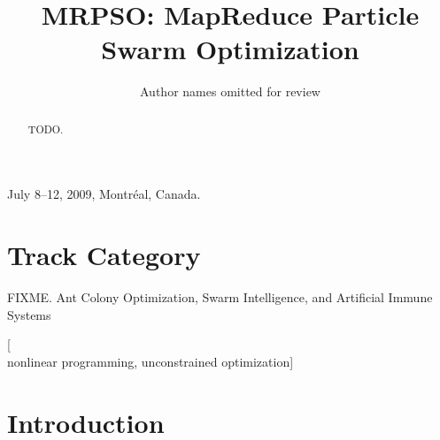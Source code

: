 \documentclass[letterpaper]{sig-alternate}
\begin{document}
\hyphenation{}

 {July 8--12, 2009, Montr\'eal, Canada.}

\title{MRPSO: MapReduce Particle Swarm Optimization}
\date{}

\author{Author names omitted for review}

\maketitle

\begin{abstract}
TODO.
\end{abstract}

\section*{Track Category}
FIXME. Ant Colony Optimization, Swarm Intelligence, and Artificial Immune Systems

[\\ nonlinear programming, unconstrained optimization]



\section{Introduction}
\end{document}
